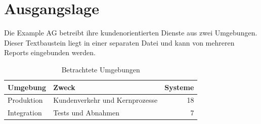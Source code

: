 \section{Ausgangslage}

Die Example AG betreibt ihre kundenorientierten Dienste aus zwei Umgebungen.
Dieser Textbaustein liegt in einer separaten Datei und kann von mehreren Reports
eingebunden werden.

\begin{table}[htbp]
  \centering
  \begin{tabularx}{\textwidth}{@{}l X r@{}}
    \toprule
    Umgebung & Zweck & Systeme \\
    \midrule
    Produktion & Kundenverkehr und Kernprozesse & 18 \\
    Integration & Tests und Abnahmen & 7 \\
    \bottomrule
  \end{tabularx}
  \caption{Betrachtete Umgebungen}
\end{table}

